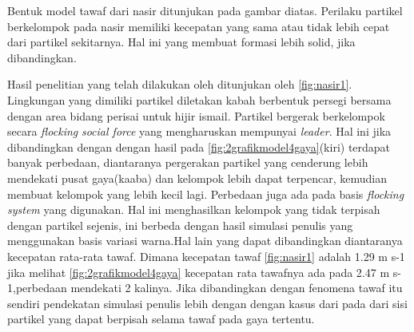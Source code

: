 \hspace{0.6cm}Bentuk model tawaf dari nasir\citep{Nasir2016} ditunjukan pada gambar diatas. Perilaku partikel berkelompok pada nasir memiliki kecepatan yang sama atau tidak lebih cepat dari partikel sekitarnya. Hal ini yang membuat formasi lebih solid, jika dibandingkan.

\hspace{0.6cm} Hasil penelitian yang telah dilakukan oleh 
\citep{Nasir2016} ditunjukan oleh \ref{fig:nasir1}. Lingkungan yang dimiliki partikel diletakan kabah berbentuk persegi bersama dengan area bidang perisai untuk hijir ismail. Partikel bergerak berkelompok secara \textit{flocking} \textit{social force} yang mengharuskan mempunyai \textit{leader}. Hal ini jika dibandingkan dengan dengan hasil pada \ref{fig:2grafikmodel4gaya}(kiri) terdapat banyak perbedaan, diantaranya pergerakan partikel yang cenderung lebih mendekati pusat gaya(kaaba) dan kelompok lebih dapat terpencar, kemudian membuat kelompok yang lebih kecil lagi. Perbedaan juga ada pada basis \textit{flocking system} yang digunakan. Hal ini menghasilkan kelompok yang tidak terpisah dengan partikel sejenis, ini berbeda dengan hasil simulasi penulis yang menggunakan basis variasi warna.Hal lain yang dapat dibandingkan diantaranya kecepatan rata-rata tawaf. Dimana kecepatan tawaf \ref{fig:nasir1} adalah 1.29 m s-1 \citep{Nasir2016} jika melihat \ref{fig:2grafikmodel4gaya} kecepatan rata tawafnya ada pada 2.47 m s-1,perbedaan mendekati 2 kalinya. Jika dibandingkan dengan fenomena tawaf itu sendiri pendekatan simulasi penulis lebih dengan dengan kasus dari pada \citep{Nasir2016} dari sisi partikel yang dapat berpisah selama tawaf pada gaya tertentu.







%
%

